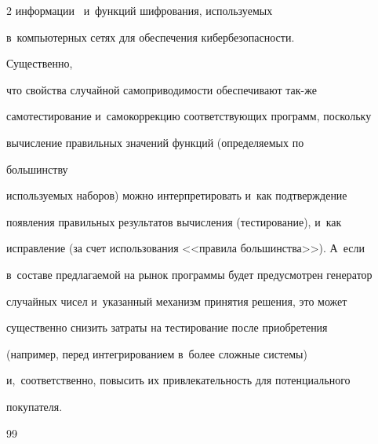 \begin{multicols}{2}
информации~\cite{15-bf} и~функций шифрования, используемых 


в~компьютерных сетях для обеспечения кибербезопасности. 


%


Существенно, 


что свойства случайной самоприводимости обеспечивают так-\linebreak же


самотестирование и~самокоррекцию со\-от\-вет\-ст\-ву\-ющих программ, поскольку 


вычисление правильных значений функций (определяемых по\linebreak


 большинству 


используемых наборов) можно интерпретировать и~как под\-тверж\-де\-ние 


появления правильных результатов вычисления (тестирование), и~как 


ис\-прав\-ле\-ние (за счет использования <<правила большинства>>). А~если 


в~со\-ста\-ве предлагаемой на рынок программы будет преду\-смот\-рен генератор 


случайных чисел и~указанный механизм принятия решения, это может 


существенно снизить за\-тра\-ты на тес\-ти\-ро\-ва\-ние после приобретения 


(например, перед интегрированием в~более слож\-ные сис\-те\-мы) 


и,~соответственно, повысить их привлекательность для потенциального 


покупателя.





\vspace*{-8pt}


    


  {\small\frenchspacing


 {%




 \begin{thebibliography}{99}


 


 \vspace*{-1pt}


 



\end{thebibliography}}}
\end{multicols}
